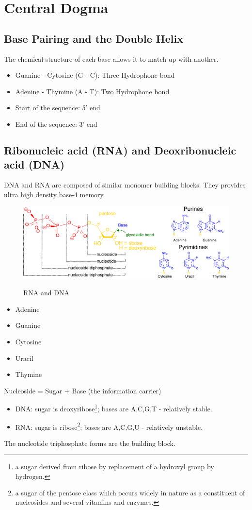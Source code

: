 \chapter{Central Dogma}

\section{Base Pairing and the Double Helix}
The chemical structure of each base allows it to match up with another.
\begin{itemize}
    \item Guanine - Cytosine (G - C): Three Hydrophone bond
    \item Adenine - Thymine (A - T): Two Hydrophone bond
    \item Start of the sequence: 5' end
    \item End of the sequence: 3' end
\end{itemize}

\section{Ribonucleic acid (RNA) and Deoxribonucleic acid (DNA)}

DNA and RNA are composed of similar monomer building blocks. They provides ultra high density base-4 memory.

\begin{figure}[h]
\centering
\includegraphics[width=1\textwidth]{images/Nucleotides.png}\\[.2in]
\caption{RNA and DNA} 
\end{figure}

\begin{itemize}[noitemsep]
    \item {} Adenine
    \item {} Guanine
    \item {} Cytosine
    \item {} Uracil
    \item {} Thymine
\end{itemize}
Nucleoside = Sugar + Base (the information carrier)
\begin{itemize}
    \item DNA: sugar is deoxyribose\footnote{a sugar derived from ribose by replacement of a hydroxyl group by hydrogen.}; bases are A,C,G,T - relatively stable.
    \item RNA: sugar is ribose\footnote{a sugar of the pentose class which occurs widely in nature as a constituent of nucleosides and several vitamins and enzymes.}; bases are A,C,G,U - relatively unstable.
\end{itemize}
The nucleotide triphosphate forms are the building block.

